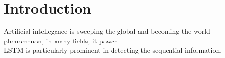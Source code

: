 \section{Introduction}
Artificial intellegence is sweeping the global and becoming the world phenomenon, in many fields, it power
\\
LSTM is particularly prominent in detecting the sequential information. 